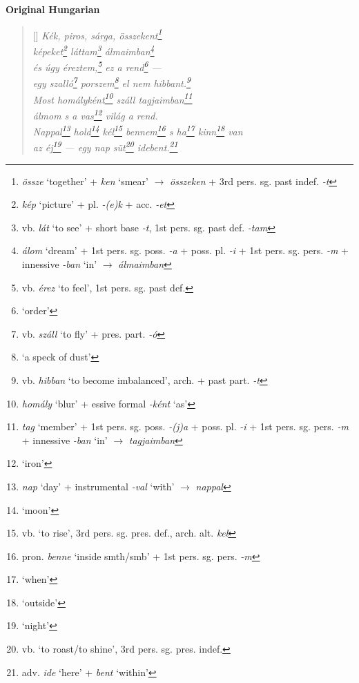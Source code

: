 \documentclass[a4paper,12pt,twoside,final]{book}
\begin{document}
\newpage


\noindent \textbf{Original Hungarian}



\settowidth{\versewidth}{Nappal hold kél bennem s ha kinn van}

\begin{verse}[\versewidth]
  \it
  Kék, piros, sárga, összekent\footnote{\emph{össze} `together' +
  \emph{ken} `smear' $\rightarrow$ \emph{összeken} + 3rd
  pers. sg. past indef. \emph{-t}} \\
  képeket\footnote{\emph{kép} `picture' + pl. \emph{-(e)k} +
  acc. \emph{-et}} láttam\footnote{vb. \emph{lát} `to see' +
  short base \emph{-t}, 1st pers. sg. past def. \emph{-tam}}
  álmaimban\footnote{\emph{álom} `dream' +
  1st pers. sg. poss. \emph{-a} + poss. pl. \emph{-i} + 1st
  pers. sg. pers. \emph{-m} + innessive \emph{-ban} `in' $\rightarrow$
  \emph{álmaimban}} \\
  és úgy éreztem,\footnote{vb. \emph{érez} `to feel', 1st
  pers. sg. past def.} ez a rend\footnote{`order'} --- \\
  egy szalló\footnote{vb. \emph{száll} `to fly' +
  pres. part. \emph{-ó}} porszem\footnote{`a speck of dust'} el nem
  hibbant.\footnote{vb. \emph{hibban}
  `to become imbalanced', arch. + past part. \emph{-t}} \\
  Most homályként\footnote{\emph{homály} `blur' +
  essive formal \emph{-ként} `as'} száll tagjaimban\footnote{\emph{tag}
  `member' + 1st pers. sg. poss. \emph{-(j)a} +
  poss. pl. \emph{-i} + 1st pers. sg. pers. \emph{-m} +
  innessive \emph{-ban} `in' $\rightarrow$ \emph{tagjaimban}} \\
  álmom s a vas\footnote{`iron'} világ a rend. \\
  Nappal\footnote{\emph{nap} `day' + instrumental \emph{-val}
  `with' $\rightarrow$ \emph{nappal}} hold\footnote{`moon'}
  kél\footnote{vb. `to rise', 3rd pers. sg. pres. def.,
  arch. alt. \emph{kel}} bennem\footnote{pron. \emph{benne} `inside
  smth/smb' + 1st pers. sg. pers. \emph{-m}} s ha\footnote{`when'}
  kinn\footnote{`outside'} van  \\
  az éj\footnote{`night'} --- egy nap süt\footnote{vb. `to
  roast/to shine', 3rd pers. sg. pres. indef.}
  idebent.\footnote{adv. \emph{ide} `here' + \emph{bent} `within'} \\
\end{verse}
\end{document}
